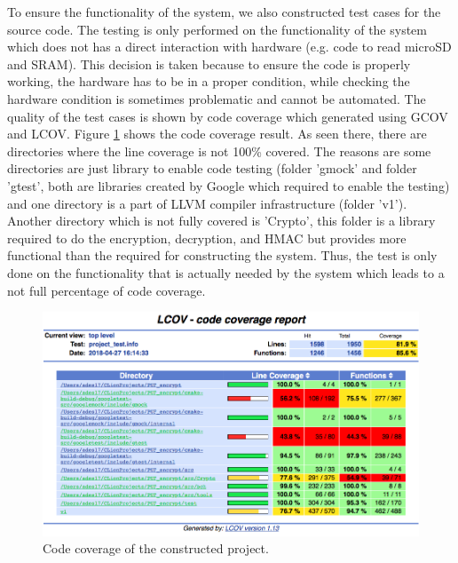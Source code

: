To ensure the functionality of the system, we also constructed test cases for the source code. The testing is only performed on the functionality of the system which does not has a direct interaction with hardware (e.g. code to read microSD and SRAM). This decision is taken because to ensure the code is properly working, the hardware has to be in a proper condition, while checking the hardware condition is sometimes problematic and cannot be automated. The quality of the test cases is shown by code coverage which generated using GCOV and LCOV. Figure \ref{fig:code_coverage} shows the code coverage result. As seen there, there are directories where the line coverage is not 100\% covered. The reasons are some directories are just library to enable code testing (folder 'gmock' and folder 'gtest', both are libraries created by Google which required to enable the testing) and one directory is a part of LLVM compiler infrastructure (folder 'v1'). Another directory which is not fully covered is 'Crypto', this folder is a library required to do the encryption, decryption, and HMAC but provides more functional than the required for constructing the system. Thus, the test is only done on the functionality that is actually needed by the system which leads to a not full percentage of code coverage.

\begin{figure}[tph!]
    \centerline{\includegraphics[width={\textwidth}]{images/code_coverage}}
    \caption{Code coverage of the constructed project.}
    \label{fig:code_coverage}
\end{figure}

